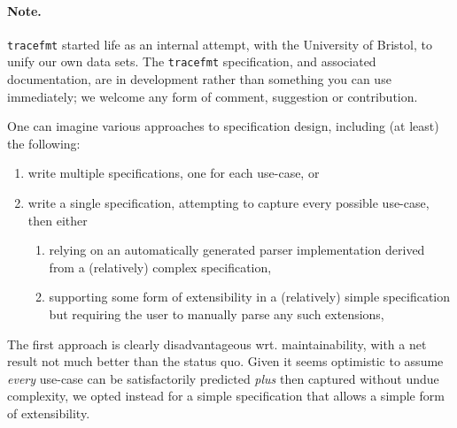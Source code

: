 \documentclass[10pt,a4paper]{llncs}
\begin{document}
\paragraph{Note.} 
{\tt tracefmt} started life as an internal attempt, with the University of 
Bristol, to unify our own data sets.  The {\tt tracefmt} specification, and
associated documentation, are in development rather than something you can 
use immediately; we welcome any form of comment, suggestion or contribution.


One can imagine various approaches to specification design, including (at
least) the following:

\begin{enumerate}
\item write multiple specifications, one for each use-case,
      or
\item write a single specification, attempting to capture every possible 
      use-case, then either

      \begin{enumerate}
      \item relying on an automatically generated parser implementation 
            derived from a (relatively) complex specification,
      \item supporting some form of extensibility in a (relatively) simple
            specification but requiring the user to manually parse any such 
            extensions,
      \end{enumerate}
\end{enumerate}

\noindent
The first approach is clearly disadvantageous wrt. maintainability, with a
net result not much better than the status quo.  Given it seems optimistic 
to assume {\em every} use-case can be satisfactorily predicted {\em plus} 
then captured without undue complexity, we opted instead for a simple 
specification that allows a simple form of extensibility.



\end{document}
